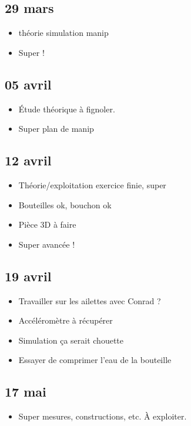 \documentclass[a4paper, 11pt, final, garamond]{book}
\begin{document}
\subsection{29 mars}
\begin{itemize}
	\item théorie simulation manip
	\item Super !
\end{itemize}

\subsection{05 avril}
\begin{itemize}
	\item Étude théorique à fignoler.
	\item Super plan de manip
\end{itemize}

\subsection{12 avril}
\begin{itemize}
	\item Théorie/exploitation exercice finie, super
	\item Bouteilles ok, bouchon ok
	\item Pièce 3D à faire
	\item Super avancée !
\end{itemize}

\subsection{19 avril}
\begin{itemize}
	\item Travailler sur les ailettes avec Conrad ?
	\item Accéléromètre à récupérer
	\item Simulation ça serait chouette
	\item Essayer de comprimer l'eau de la bouteille
\end{itemize}

\subsection{17 mai}
\begin{itemize}
	\item Super mesures, constructions, etc. À exploiter.
\end{itemize}
\end{document}
